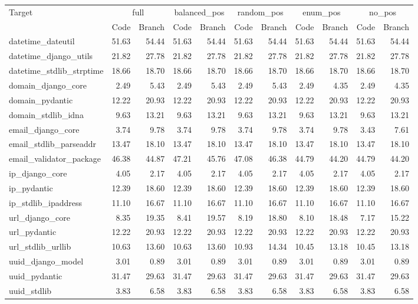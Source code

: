 \begin{tabular}{lrrrrrrrrrr}
\toprule
Target & \multicolumn{2}{c}{full} & \multicolumn{2}{c}{balanced\_pos} & \multicolumn{2}{c}{random\_pos} & \multicolumn{2}{c}{enum\_pos} & \multicolumn{2}{c}{no\_pos} \\
 & Code & Branch & Code & Branch & Code & Branch & Code & Branch & Code & Branch \\
\midrule
datetime\_dateutil & 51.63 & 54.44 & 51.63 & 54.44 & 51.63 & 54.44 & 51.63 & 54.44 & 51.63 & 54.44 \\
datetime\_django\_utils & 21.82 & 27.78 & 21.82 & 27.78 & 21.82 & 27.78 & 21.82 & 27.78 & 21.82 & 27.78 \\
datetime\_stdlib\_strptime & 18.66 & 18.70 & 18.66 & 18.70 & 18.66 & 18.70 & 18.66 & 18.70 & 18.66 & 18.70 \\
domain\_django\_core & 2.49 & 5.43 & 2.49 & 5.43 & 2.49 & 5.43 & 2.49 & 4.35 & 2.49 & 4.35 \\
domain\_pydantic & 12.22 & 20.93 & 12.22 & 20.93 & 12.22 & 20.93 & 12.22 & 20.93 & 12.22 & 20.93 \\
domain\_stdlib\_idna & 9.63 & 13.21 & 9.63 & 13.21 & 9.63 & 13.21 & 9.63 & 13.21 & 9.63 & 13.21 \\
email\_django\_core & 3.74 & 9.78 & 3.74 & 9.78 & 3.74 & 9.78 & 3.74 & 9.78 & 3.43 & 7.61 \\
email\_stdlib\_parseaddr & 13.47 & 18.10 & 13.47 & 18.10 & 13.47 & 18.10 & 13.47 & 18.10 & 13.47 & 18.10 \\
email\_validator\_package & 46.38 & 44.87 & 47.21 & 45.76 & 47.08 & 46.38 & 44.79 & 44.20 & 44.79 & 44.20 \\
ip\_django\_core & 4.05 & 2.17 & 4.05 & 2.17 & 4.05 & 2.17 & 4.05 & 2.17 & 4.05 & 2.17 \\
ip\_pydantic & 12.39 & 18.60 & 12.39 & 18.60 & 12.39 & 18.60 & 12.39 & 18.60 & 12.39 & 18.60 \\
ip\_stdlib\_ipaddress & 11.10 & 16.67 & 11.10 & 16.67 & 11.10 & 16.67 & 11.10 & 16.67 & 11.10 & 16.67 \\
url\_django\_core & 8.35 & 19.35 & 8.41 & 19.57 & 8.19 & 18.80 & 8.10 & 18.48 & 7.17 & 15.22 \\
url\_pydantic & 12.22 & 20.93 & 12.22 & 20.93 & 12.22 & 20.93 & 12.22 & 20.93 & 12.22 & 20.93 \\
url\_stdlib\_urllib & 10.63 & 13.60 & 10.63 & 13.60 & 10.93 & 14.34 & 10.45 & 13.18 & 10.45 & 13.18 \\
uuid\_django\_model & 3.01 & 0.89 & 3.01 & 0.89 & 3.01 & 0.89 & 3.01 & 0.89 & 3.01 & 0.89 \\
uuid\_pydantic & 31.47 & 29.63 & 31.47 & 29.63 & 31.47 & 29.63 & 31.47 & 29.63 & 31.47 & 29.63 \\
uuid\_stdlib & 3.83 & 6.58 & 3.83 & 6.58 & 3.83 & 6.58 & 3.83 & 6.58 & 3.83 & 6.58 \\
\bottomrule
\end{tabular}
